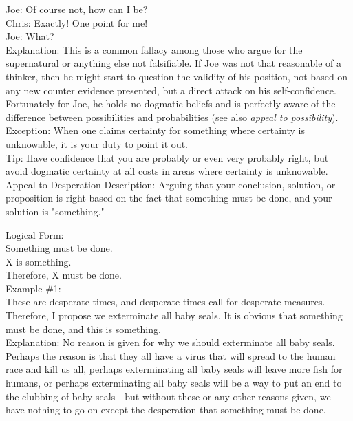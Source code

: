 \documentclass[a4paper,12pt,single,pdftex]{scrartcl}
\begin{document}
    
      Joe: Of course not, how can I be?
    \\

    
      Chris: Exactly! One point for me!
    \\

    
      Joe: What?
    \\

    
      Explanation: This is a common fallacy among those who argue for the supernatural or anything else not falsifiable.  If Joe was not that reasonable of a thinker, then he might start to question the validity of his position, not based on any new counter evidence presented, but a direct attack on his self-confidence.  Fortunately for Joe, he holds no dogmatic beliefs and is perfectly aware of the difference between possibilities and probabilities (see also {\it appeal to possibility}).
    \\

    
      Exception: When one claims certainty for something where certainty is unknowable, it is your duty to point it out.
    \\

    
      Tip: Have confidence that you are probably or even very probably right, but avoid dogmatic certainty at all costs in areas where certainty is unknowable.
    \\

  

Appeal to Desperation
    Description: Arguing that your conclusion, solution, or proposition is right based on the fact that something must be done, and your solution is "something."

    
      Logical Form:
    \\

    
      Something must be done.
    \\

    
      X is something.
    \\

    
      Therefore, X must be done.
    \\

    
      Example \#1:
    \\

    
      These are desperate times, and desperate times call for desperate measures.  Therefore, I propose we exterminate all baby seals.  It is obvious that something must be done, and this is something.
    \\

    
      Explanation: No reason is given for why we should exterminate all baby seals.  Perhaps the reason is that they all have a virus that will spread to the human race and kill us all, perhaps exterminating all baby seals will leave more fish for humans, or perhaps exterminating all baby seals will be a way to put an end to the clubbing of baby seals—but without these or any other reasons given, we have nothing to go on except the desperation that something must be done.
    \\
\end{document}
